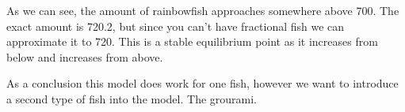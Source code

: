 \begin{flushleft}
    As we can see, the amount of rainbowfish approaches somewhere
    above 700.
    The exact amount is 720.2, but since you can't have
    fractional fish we can approximate it to 720. This is
    a stable equilibrium point as it increases from below
    and increases from above.
\end{flushleft}

\begin{flushleft}
    As a conclusion this model does work for one fish,
    however we want to introduce a second type of fish
    into the model. The grourami.
\end{flushleft}


